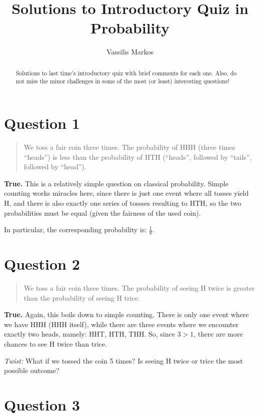 \documentclass[
]{article}
\title{Solutions to Introductory Quiz in Probability}
\author{Vassilis Markos}
\date{}
\begin{document}
\maketitle
\begin{abstract}
Solutions to last time's introductory quiz with brief comments for each
one. Also, do not miss the minor challenges in some of the most (or
least) interesting questions!
\end{abstract}

\section{Question 1}\label{question-1}

\begin{quote}
We toss a fair coin three times. The probability of HHH (three times
``heads'') is less than the probability of HTH (``heads'', followed by
``tails'', followed by ``head'').
\end{quote}

\textbf{True.} This is a relatively simple question on classical
probability. Simple counting works miracles here, since there is just
one event where all tosses yield H, and there is also exactly one series
of tossses resulting to HTH, so the two probabilities must be equal
(given the fairness of the used coin).

In particular, the corresponding probability is: \(\frac{1}{8}\).

\section{Question 2}\label{question-2}

\begin{quote}
We toss a fair coin three times. The probability of seeing H twice is
greater than the probability of seeing H trice.
\end{quote}

\textbf{True.} Again, this boils down to simple counting. There is only
one event where we have HHH (HHH itself), while there are three events
where we encounter exactly two heads, namely: HHT, HTH, THH. So, since
\(3>1\), there are more chances to see H twice than trice.

\emph{Twist:} What if we tossed the coin 5 times? Is seeing H twice or
trice the most possible outcome?

\section{Question 3}\label{question-3}
\end{document}
